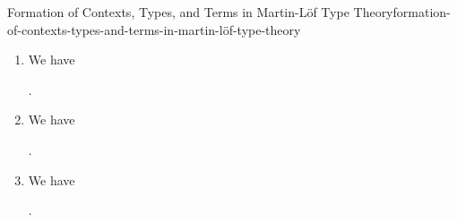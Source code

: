 \begin{definition}{Formation of Contexts, Types, and Terms in Martin-Löf Type Theory}{formation-of-contexts-types-and-terms-in-martin-löf-type-theory}
\begin{enumerate}
        \item\label{formation-of-contexts-types-and-terms-in-martin-löf-type-theory-formation-of-terms}We have
            \begin{webprooftree}%
                \begin{prooftree}%
                \end{prooftree}%
                .%
            \end{webprooftree}%
        \item\label{formation-of-contexts-types-and-terms-in-martin-löf-type-theory-formation-of-judgemental-equality-of-terms-1}We have
            \begin{webprooftree}%
                \begin{prooftree}%
                \end{prooftree}%
                .%
            \end{webprooftree}%
        \item\label{formation-of-contexts-types-and-terms-in-martin-löf-type-theory-formation-of-judgemental-equality-of-terms-3}We have
            \begin{webprooftree}%
                \begin{prooftree}%
                \end{prooftree}%
                .%
            \end{webprooftree}%
    \end{enumerate}
\end{definition}
